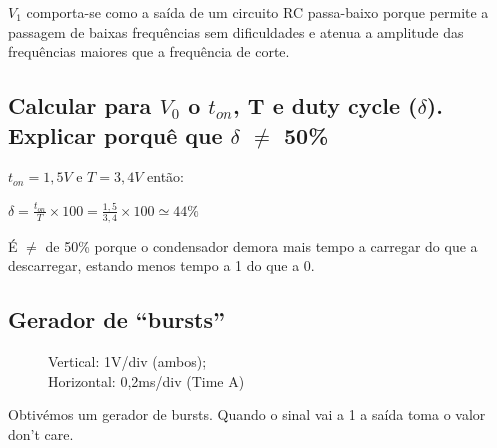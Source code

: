 \documentclass[pdftex,12pt,a4paper]{report}
\begin{document}
$V_1$ comporta-se como a saída de um circuito RC passa-baixo porque permite a passagem de baixas frequências sem dificuldades e atenua a amplitude das frequências maiores que a frequência de corte.
\vspace{0.5cm}

\subsection{Calcular para $V_0$ o $t_{on}$, T e duty cycle ($\delta$). Explicar porquê que $\delta$ $\neq$ 50\%}

$t_{on} = 1,5V$ e $T = 3,4V$ então:
\vspace{0.3cm}

$\delta = \frac{t_{on}}{T}\times100 = \frac{1,5}{3,4}\times100 \simeq 44 \% $
\vspace{0.3cm}

É $\neq$ de 50\% porque o condensador demora mais tempo a carregar do que a descarregar, estando menos tempo a 1 do que a 0.

\subsection{Gerador de “bursts”}
\begin{figure}[h]
  \centerline{}
  \caption{Vertical: 1V/div (ambos); \\Horizontal: 0,2ms/div (Time A)}\label{cmos}
\end{figure}

Obtivémos um gerador de bursts. Quando o sinal vai a 1 a saída toma o valor don't care.
\end{document}
